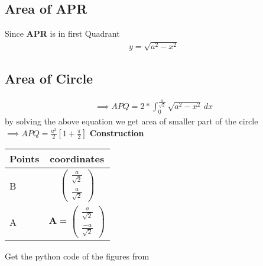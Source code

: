 \documentclass[10pt,a4paper]{report}
\newcommand{\myvec}[1]{\ensuremath{\begin{pmatrix}#1\end{pmatrix}}}
\let\vec\mathbf
\let\vec\mathbf
\begin{document}
\begin{multicols}{2}
\subsection*{Area of APR}
Since \textbf{APR} is in first Quadrant \\
\begin{align}
y=\sqrt{a^2-x^2}
\end{align}
\subsection*{Area of Circle}

\begin{align} 
\implies APQ=2*\int_{0}^{\frac{a}{\sqrt{2}}}\sqrt{a^2-x^2}\,dx 
\end{align}
by solving the above equation we get area of  smaller part of the circle\\



\vspace{3mm}
$\implies APQ=\frac{a^2}{2}[1+\frac{\pi}{2}]$\vspace{3mm}
 \vspace{2mm} \textbf{Construction}
\begin{center}
\setlength{\arrayrulewidth}{0.5mm}
\setlength{\tabcolsep}{6pt}
\renewcommand{\arraystretch}{1.5}
    \begin{tabular}{|l|c|}
    \hline 
    \textbf{Points} & \textbf{coordinates} \\ \hline
   B & $\myvec{
\frac{a}{\sqrt{2}}\\
\frac{a}{\sqrt{2}}
   } $ \\\hline
   A & $
   \vec{A}=\myvec{
\frac{a}{\sqrt{2}}\\
\frac{-a}{\sqrt{2}}
   } $ 
   \\\hline
      \end{tabular}
  \end{center}
  \end{multicols}
 
Get the python code of the figures from

\begin{table}[h]
\large
\centering
{}

\end{table} 
\end{document}

